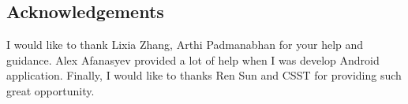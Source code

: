 \documentclass[a0,portrait]{poster}
\begin{document}
\begin{multicols}{2}

\section*{Acknowledgements}

I would like to thank Lixia Zhang, Arthi Padmanabhan for your help and guidance. Alex Afanasyev provided a lot of help when I was develop Android application. Finally, I would like to thanks Ren Sun and CSST for providing such great opportunity.

\end{multicols}
\end{document}
